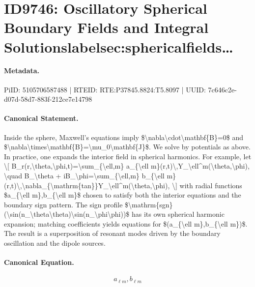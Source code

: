 \section*{ID9746: Oscillatory Spherical Boundary Fields and Integral Solutionslabelsec:sphericalfields…}
\paragraph{Metadata.}
PiID: 5105706587488 | RTEID: RTE:P37845.8824:T5.8097 | UUID: 7c646c2e-d07d-58d7-883f-212ce7e14798

\paragraph{Canonical Statement.}
Inside the sphere, Maxwell's equations imply \$\textbackslash{}nabla\textbackslash{}cdot\textbackslash{}mathbf\{B\}=0\$ and \$\textbackslash{}nabla\textbackslash{}times\textbackslash{}mathbf\{B\}=\textbackslash{}mu\_0\textbackslash{}mathbf\{J\}\$. We solve by potentials as above. In practice, one expands the interior field in spherical harmonics. For example, let \textbackslash{}[ B\_r(r,\textbackslash{}theta,\textbackslash{}phi,t)=\textbackslash{}sum\_\{\textbackslash{}ell,m\} a\_\{\textbackslash{}ell m\}(r,t)\textbackslash{},Y\_\textbackslash{}ell\textasciicircum{}m(\textbackslash{}theta,\textbackslash{}phi), \textbackslash{}quad B\_\textbackslash{}theta + iB\_\textbackslash{}phi=\textbackslash{}sum\_\{\textbackslash{}ell,m\} b\_\{\textbackslash{}ell m\}(r,t)\textbackslash{},\textbackslash{}nabla\_\{\textbackslash{}mathrm\{tan\}\}Y\_\textbackslash{}ell\textasciicircum{}m(\textbackslash{}theta,\textbackslash{}phi), \textbackslash{}] with radial functions \$a\_\{\textbackslash{}ell m\},b\_\{\textbackslash{}ell m\}\$ chosen to satisfy both the interior equations and the boundary sign pattern. The sign profile \$\textbackslash{}mathrm\{sgn\}(\textbackslash{}sin(n\_\textbackslash{}theta\textbackslash{}theta)\textbackslash{}sin(n\_\textbackslash{}phi\textbackslash{}phi))\$ has its own spherical harmonic expansion; matching coefficients yields equations for \$(a\_\{\textbackslash{}ell m\},b\_\{\textbackslash{}ell m\})\$. The result is a superposition of resonant modes driven by the boundary oscillation and the dipole sources.

\paragraph{Canonical Equation.}
\[
a_{\ell m},b_{\ell m}
\]

